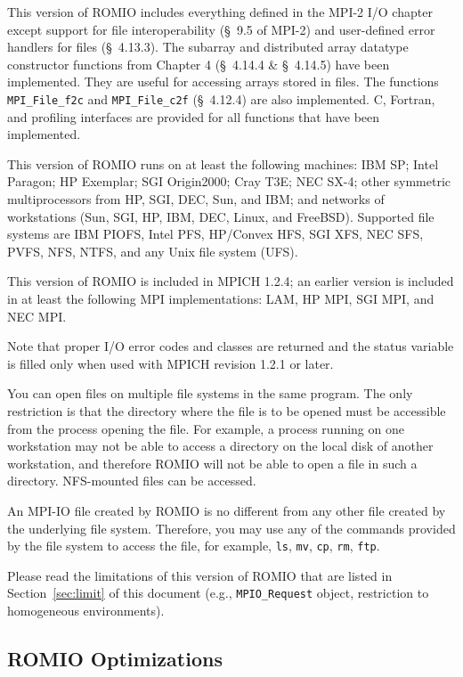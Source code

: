 This version of ROMIO includes everything defined in the MPI-2 I/O
chapter except support for file interoperability (\S~9.5 of MPI-2) and
user-defined error handlers for files (\S~4.13.3).  The subarray and
distributed array datatype constructor functions from Chapter 4
(\S~4.14.4 \& \S~4.14.5) have been implemented. They are useful for
accessing arrays stored in files. The functions {\tt MPI\_File\_f2c}
and {\tt MPI\_File\_c2f} (\S~4.12.4) are also implemented.  C,
Fortran, and profiling interfaces are provided for all functions that
have been implemented.

This version of ROMIO runs on at least the following machines: IBM SP; Intel
Paragon; HP Exemplar; SGI Origin2000; Cray T3E; NEC SX-4; other
symmetric multiprocessors from HP, SGI, DEC, Sun, and IBM; and networks of
workstations (Sun, SGI, HP, IBM, DEC, Linux, and FreeBSD).
Supported file systems are IBM PIOFS, Intel PFS, HP/Convex
HFS, SGI XFS, NEC SFS, PVFS, NFS, NTFS, and any Unix file system (UFS).

This version of ROMIO is included in MPICH 1.2.4; an earlier version
is included in at least the following MPI implementations: LAM, HP
MPI, SGI MPI, and NEC MPI. 

Note that proper I/O error codes and classes are returned and the status
variable is filled only when used with MPICH revision 1.2.1 or later.

You can open files on multiple file systems in the same program. The
only restriction is that the directory where the file is to be opened
must be accessible from the process opening the file. For example, a
process running on one workstation may not be able to access a
directory on the local disk of another workstation, and therefore
ROMIO will not be able to open a file in such a directory. NFS-mounted
files can be accessed.

An MPI-IO file created by ROMIO is no different from any other file
created by the underlying file system. Therefore, you may use any of
the commands provided by the file system to access the file, for example,
{\tt ls}, {\tt mv}, {\tt cp}, {\tt rm}, {\tt ftp}.

Please read the limitations of this version of ROMIO that are listed
in Section~\ref{sec:limit} of this document (e.g., {\tt MPIO\_Request}
object, restriction to homogeneous environments). 

\subsection{ROMIO Optimizations}
\label{sec:opt}

